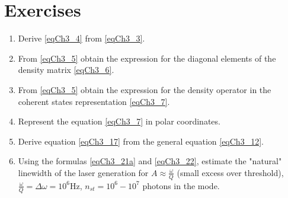 \section{Exercises}
\begin{enumerate}
\item Derive \eqref{eqCh3_4} from \eqref{eqCh3_3}.
\item From \eqref{eqCh3_5} obtain the expression for the diagonal elements
  of the density matrix \eqref{eqCh3_6}.
\item From \eqref{eqCh3_5} obtain the expression for the density operator in
  the coherent states representation \eqref{eqCh3_7}.
\item Represent the equation \eqref{eqCh3_7} in polar coordinates.
\item Derive equation \eqref{eqCh3_17} from the general equation
  \eqref{eqCh3_12}.
\item Using the formulas \label{qLaserBandwidth}
  \eqref{eqCh3_21a} and \eqref{eqCh3_22}, estimate the "natural" linewidth of the laser generation for $A
  \approx \frac{\omega}{Q}$ (small excess over threshold), 
$\frac{\omega}{Q} = \Delta \omega = 10^6 \mbox{Hz}$, 
$n_{st} = 10^6 - 10^7$ photons in the mode.
\end{enumerate}